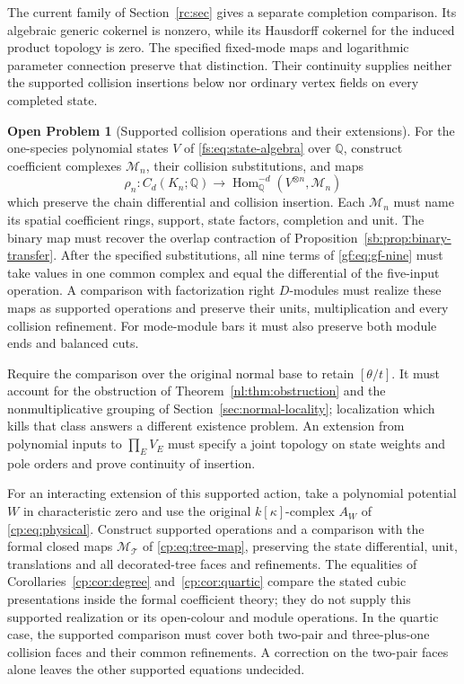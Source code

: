 \documentclass[11pt,reqno]{amsart}
\theoremstyle{definition}
\newtheorem{problem}[theorem]{Open Problem}
\theoremstyle{remark}
\begin{document}
The current family of Section~\ref{rc:sec} gives a separate
completion comparison.  Its algebraic generic cokernel is nonzero,
while its Hausdorff cokernel for the induced product topology is
zero.  The specified fixed-mode maps and logarithmic parameter
connection preserve that distinction.  Their continuity supplies
neither the supported collision insertions below nor ordinary
vertex fields on every completed state.

\begin{problem}[Supported collision operations and their extensions]
\label{prob:supported-extension}
For the one-species polynomial states \(V\) of
\eqref{fs:eq:state-algebra} over \(\mathbb Q\), construct coefficient complexes
\(\mathcal M_n\), their collision substitutions, and maps
\[
 \rho_n:C_d(K_n;\mathbb Q)\longrightarrow
       \operatorname{Hom}^{-d}_{\mathbb Q}(V^{\otimes n},\mathcal M_n)
\]
which preserve the chain differential and collision insertion.
Each \(\mathcal M_n\) must name its spatial coefficient rings,
support, state factors, completion and unit.  The binary map must
recover the overlap contraction of
Proposition~\ref{sb:prop:binary-transfer}.  After the specified
substitutions, all nine terms of \eqref{gf:eq:gf-nine} must take
values in one common complex and equal the differential of the
five-input operation.  A comparison with factorization right
\(D\)-modules must realize these maps as supported operations and
preserve their units, multiplication and every collision refinement.
For mode-module bars it must also preserve both module ends and
balanced cuts.

Require the comparison over the original normal base to retain
\([\theta/t]\).  It must account for the obstruction of
Theorem~\ref{nl:thm:obstruction} and the nonmultiplicative grouping
of Section~\ref{sec:normal-locality}; localization which kills that
class answers a different existence problem.  An extension from
polynomial inputs to \(\prod_E V_E\) must specify a joint topology
on state weights and pole orders and prove continuity of insertion.

For an interacting extension of this supported action, take a polynomial
potential \(W\) in characteristic zero and use the original
\(k[\kappa]\)-complex \(A_W\) of \eqref{cp:eq:physical}.
Construct supported operations and a comparison with the formal
closed maps \(\mathcal M_{\mathcal T}\) of
\eqref{cp:eq:tree-map}, preserving the state differential, unit,
translations and all decorated-tree faces and refinements.
The equalities of Corollaries~\ref{cp:cor:degree}
and~\ref{cp:cor:quartic} compare the stated cubic presentations
inside the formal coefficient theory; they do not supply this
supported realization or its open-colour and module operations.
In the quartic case, the supported comparison must cover both
two-pair and three-plus-one collision faces and their common
refinements.  A correction on the two-pair faces alone leaves the
other supported equations undecided.
\end{problem}
\end{document}
